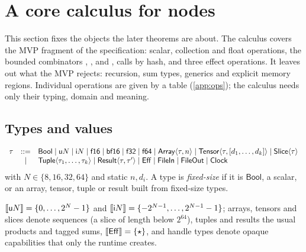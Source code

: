 \section{A core calculus for \VG{} nodes}\label{sec:calculus}

This section fixes the objects the later theorems are about. The calculus covers the MVP
fragment of the specification: scalar, collection and float operations, the bounded
combinators , ,  and , calls by
hash, and three effect operations. It leaves out what the MVP rejects: recursion, sum types,
generics and explicit memory regions. Individual operations are given by a table
(\cref{app:ops}); the calculus needs only their typing, domain and meaning.

\subsection{Types and values}

\begin{definition}[Types]\label{def:types}
\[
\begin{array}{rcl}
\tau & ::= & \mathsf{Bool} \mid \mathsf{u}N \mid \mathsf{i}N \mid \mathsf{f16} \mid
  \mathsf{bf16} \mid \mathsf{f32} \mid \mathsf{f64}
  \mid \mathsf{Array}\langle\tau, n\rangle \mid \mathsf{Tensor}\langle\tau,[d_1,\dots,d_k]\rangle
  \mid \mathsf{Slice}\langle\tau\rangle \\
  & \mid & \mathsf{Tuple}\langle\tau_1,\dots,\tau_k\rangle \mid
  \mathsf{Result}\langle\tau,\tau'\rangle \mid \mathsf{Eff} \mid \mathsf{FileIn} \mid \mathsf{FileOut}
  \mid \mathsf{Clock}
\end{array}
\]
with $N\in\{8,16,32,64\}$ and static $n, d_i$. A type is \emph{fixed-size} if it is
$\mathsf{Bool}$, a scalar, or an array, tensor, tuple or result built from fixed-size types.
\end{definition}

$\llbracket \mathsf{u}N \rrbracket = \{0,\dots,2^N-1\}$ and $\llbracket \mathsf{i}N \rrbracket=\{-2^{N-1},\dots,2^{N-1}-1\}$;
arrays, tensors and slices denote sequences (a slice of length below $2^{64}$), tuples and
results the usual products and tagged sums, $\llbracket \mathsf{Eff} \rrbracket=\{\star\}$, and handle types denote
opaque capabilities that only the runtime creates.

